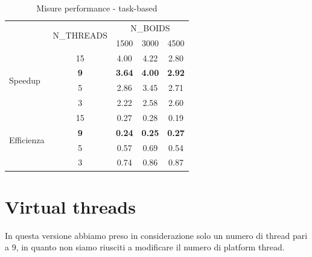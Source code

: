 \documentclass[a4paper,12pt]{report}
\begin{document}
\begin{table}[!htb]
    \renewcommand{\arraystretch}{1.5}
    \centering
    \begin{tabular}{|l|c|ccc|}
        \hline
        \multicolumn{1}{|c|}{}      & \multirow{2}{*}{N\_THREADS} & \multicolumn{3}{c|}{N\_BOIDS}                                \\ \cline{3-5}
        \multicolumn{1}{|c|}{}      &                     & \multicolumn{1}{c|}{1500} & \multicolumn{1}{c|}{3000} & 4500 \\ \hline
        \multirow{4}{*}{Speedup}    & 15                  & \multicolumn{1}{c|}{4.00} & \multicolumn{1}{c|}{4.22} & 2.80 \\ \cline{2-5} 
         & \textbf{9}                    & \multicolumn{1}{c|}{\textbf{3.64}} & \multicolumn{1}{c|}{\textbf{4.00}} & \textbf{2.92} \\ \cline{2-5}
         & 5 & \multicolumn{1}{c|}{2.86} & \multicolumn{1}{c|}{3.45} & 2.71 \\ \cline{2-5} 
         & 3 & \multicolumn{1}{c|}{2.22} & \multicolumn{1}{c|}{2.58} & 2.60 \\ \hline
        \multirow{4}{*}{Efficienza} & 15                  & \multicolumn{1}{c|}{0.27} & \multicolumn{1}{c|}{0.28} & 0.19 \\ \cline{2-5} 
         & \textbf{9}   & \multicolumn{1}{c|}{\textbf{0.24}} & \multicolumn{1}{c|}{\textbf{0.25}} & \textbf{0.27} \\ \cline{2-5}
         & 5            & \multicolumn{1}{c|}{0.57} & \multicolumn{1}{c|}{0.69} & 0.54 \\ \cline{2-5} 
         & 3            & \multicolumn{1}{c|}{0.74} & \multicolumn{1}{c|}{0.86} & 0.87 \\ \hline
    \end{tabular}
    \caption{Misure performance - task-based}
    \label{table:performance_task-based}
\end{table}

\section{Virtual threads}
In questa versione abbiamo preso in considerazione solo un numero di thread pari a 9, in quanto non siamo riusciti a modificare il numero di platform thread.
\end{document}
